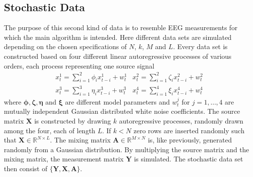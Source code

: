 \subsection{Stochastic Data}\label{sec:stoch_data}
The purpose of this second kind of data is to resemble EEG measurements for which the main algorithm is intended. 
Here different data sets are simulated depending on the chosen specifications of $N$, $k$, $M$ and $L$. 
Every data set is constructed based on four different linear autoregressive processes of various orders, each process representing one source signal
\begin{align*}
&x_{t}^{1} = \sum_{i=1}^{2} \phi_i x_{t-i}^{1} + w_t^{1} &x_{t}^{2} = \sum_{i=1}^{2} \zeta_i x_{t-i}^{2} + w_t^{2} \\
&x_{t}^{3} = \sum_{i=1}^{3} \eta_i x_{t-i}^{3} + w_t^{3}  &x_{t}^{4} = \sum_{i=1}^{4} \xi_i x_{t-i}^{4} + w_t^{4}
\end{align*}
where $\boldsymbol{\phi}, \boldsymbol{\zeta}, \boldsymbol{\eta}$ and $\boldsymbol{\xi}$ are different model parameters and $w_t^{j}$ for $j = 1,\dots ,4$ are mutually independent Gaussian distributed white noise coefficients.
The source matrix $\mathbf{X}$ is constructed by drawing $k$ autoregressive processes, randomly drawn among the four, each of length $L$. 
If $k < N$ zero rows are inserted randomly such that $\mathbf{X} \in \mathbb{R}^{N \times L}$. 
The mixing matrix $\mathbf{A} \in \mathbb{R}^{M \times N}$ is, like previously, generated randomly from a Gaussian distribution.
By multiplying the source matrix and the mixing matrix, the measurement matrix $\mathbf{Y}$ is simulated. 
The stochastic data set then consist of $\{ \mathbf{Y}, \mathbf{X}, \mathbf{A} \}$. 

